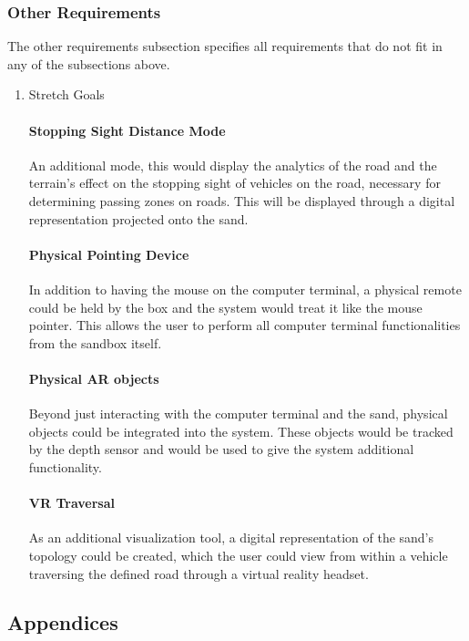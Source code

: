 \subsubsection{Other Requirements}

The other requirements subsection specifies all requirements that do not fit in any of the subsections above.
\begin{enumerate}
\item{Stretch Goals}
\paragraph{Stopping Sight Distance Mode}
An additional mode, this would display the analytics of the road and the terrain's effect on the stopping sight of vehicles on the road, necessary for determining passing zones on roads. This will be displayed through a digital representation projected onto the sand.
\paragraph{Physical Pointing Device}
In addition to having the mouse on the computer terminal, a physical remote could be held by the box and the system would treat it like the mouse pointer.  This allows the user to perform all computer terminal functionalities from the sandbox itself.

\paragraph{Physical AR objects}
Beyond just interacting with the computer terminal and the sand, physical objects could be integrated into the system. These objects would be tracked by the depth sensor and would be used to give the system additional functionality.

\paragraph{VR Traversal}
As an additional visualization tool, a digital representation of the sand's topology could be created, which the user could view from within a vehicle traversing the defined road through a virtual reality headset.
\end{enumerate}
\pagebreak
\subsection{Appendices}
